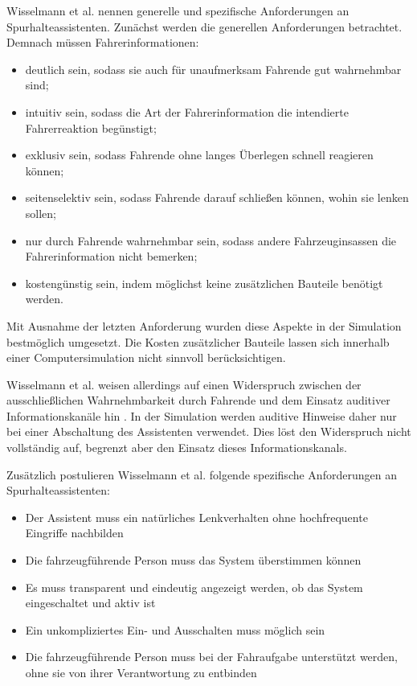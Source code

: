 Wisselmann et al. \cite{wisselmann2024querfuehrungsassistenz} nennen generelle und spezifische Anforderungen an Spurhalteassistenten. Zunächst werden die generellen Anforderungen betrachtet. Demnach müssen Fahrerinformationen:

\begin{itemize}
    \item deutlich sein, sodass sie auch für unaufmerksam Fahrende gut wahrnehmbar sind;
    \item intuitiv sein, sodass die Art der Fahrerinformation die intendierte Fahrerreaktion begünstigt;
    \item exklusiv sein, sodass Fahrende ohne langes Überlegen schnell reagieren können;
    \item seitenselektiv sein, sodass Fahrende darauf schließen können, wohin sie lenken sollen;
    \item nur durch Fahrende wahrnehmbar sein, sodass andere Fahrzeuginsassen die Fahrerinformation nicht bemerken;
    \item kostengünstig sein, indem möglichst keine zusätzlichen Bauteile benötigt werden.
\end{itemize}

Mit Ausnahme der letzten Anforderung wurden diese Aspekte in der Simulation bestmöglich umgesetzt. Die Kosten zusätzlicher Bauteile lassen sich innerhalb einer Computersimulation nicht sinnvoll berücksichtigen.

Wisselmann et al. weisen allerdings auf einen Widerspruch zwischen der ausschließlichen Wahrnehmbarkeit durch Fahrende und dem Einsatz auditiver Informationskanäle hin \cite{wisselmann2024querfuehrungsassistenz}. In der Simulation werden auditive Hinweise daher nur bei einer Abschaltung des Assistenten verwendet. Dies löst den Widerspruch nicht vollständig auf, begrenzt aber den Einsatz dieses Informationskanals.

Zusätzlich postulieren Wisselmann et al. folgende spezifische Anforderungen an Spurhalteassistenten:

\begin{itemize}
    \item Der Assistent muss ein natürliches Lenkverhalten ohne hochfrequente Eingriffe nachbilden
    \item Die fahrzeugführende Person muss das System überstimmen können
    \item Es muss transparent und eindeutig angezeigt werden, ob das System eingeschaltet und aktiv ist
    \item Ein unkompliziertes Ein- und Ausschalten muss möglich sein
    \item Die fahrzeugführende Person muss bei der Fahraufgabe unterstützt werden, ohne sie von ihrer Verantwortung zu entbinden
\end{itemize}

